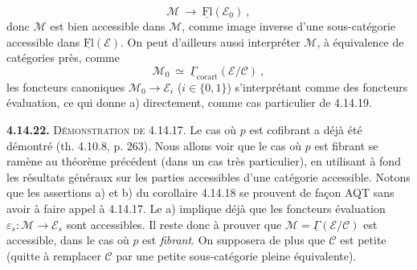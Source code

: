 \documentclass[11pt]{article}
\newcommand{\printedpage}[1]{\marginpar{\footnotesize p.~#1}}
\newcommand{\msp}[1]{\marginpar{\footnotesize [#1]}}
\newcommand{\uFl}{\underline{\mathrm{Fl}}}
\newcommand{\uGamma}{\underline{\Gamma}}
\newcommand{\cocart}{\mathrm{cocart}}
\begin{document}
\[
\mathcal{M} \ \longrightarrow \ \uFl(\mathcal{E}_0) \ ,
\]
donc $\mathcal{M}$ est bien accessible dans $\mathcal{M}$, comme image inverse d’une sous-catégorie accessible dans $\uFl(\mathcal{E})$. On peut d’ailleurs aussi interpréter $\mathcal{M}$, à équivalence de catégories près, comme %
\msp{page 400}
\[
\mathcal{M}_0 \ \simeq \ \uGamma_{\cocart}(\mathcal{E}/\mathcal{C}) \ ,
\]
les foncteurs canoniques $\mathcal{M}_0 \longrightarrow \mathcal{E}_i$ ($i \in \{0,1\}$) s’interprétant comme des foncteurs évaluation, ce qui donne a) directement, comme cas particulier de 4.14.19. %

\printedpage{152}

\textbf{4.14.22.} \textsc{Démonstration de} 4.14.17. Le cas où $p$ est cofibrant a déjà été démontré (th. 4.10.8, p. 263). Nous allons voir que le cas où $p$ est fibrant se ramène au théorème précédent (dans un cas très particulier), en utilisant à fond les résultats généraux sur les parties accessibles d’une catégorie accessible. Notons que les assertions a) et b) du corollaire 4.14.18 se prouvent de façon AQT sans avoir à faire appel à 4.14.17. Le a) implique déjà que les foncteurs évaluation $\varepsilon_s : \mathcal{M} \longrightarrow \mathcal{E}_s$ sont accessibles. Il reste donc à prouver
\msp{page 401}
que $\mathcal{M} = \uGamma(\mathcal{E}/\mathcal{C})$ est accessible, dans le cas où $p$ est \textit{fibrant}. On supposera de plus que $\mathcal{C}$ est petite (quitte à remplacer $\mathcal{C}$ par une petite sous-catégorie pleine équivalente).
\end{document}
